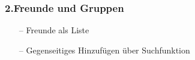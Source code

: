 \documentclass[aspectratio=1610]{beamer}
\begin{document}

	\begin{frame}[plain]
	\frametitle{2.Freunde und Gruppen}
	\begin{minipage}{0.5\textwidth}
	\setlength{\fboxsep}{0pt}%
	\setlength{\fboxrule}{1pt}%
	\captionsetup{labelformat=empty}
	\centering
	\end{minipage}%
	\begin{minipage}{0.5\textwidth}
		\begin{itemize}
			\setlength\itemsep{0.3em}
			\item[--] Freunde als Liste
			\item[--]	Gegenseitiges Hinzufügen über Suchfunktion
		\end{itemize}
	\end{minipage}%
	\end{frame}
\end{document}
